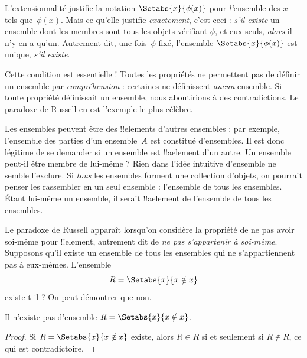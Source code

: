 \documentclass[../../../include/open-logic-section]{subfiles}
\begin{document}

L'extensionnalité justifie la notation $\Setabs{x}{\phi(x)}$ pour
\emph{l'}ensemble des $x$ tels que~$\phi(x)$. Mais ce qu'elle
justifie \emph{exactement}, c'est ceci : \emph{s'il existe}
un ensemble dont les membres sont tous les objets vérifiant
$\phi$, et eux seuls, \emph{alors} il n'y en a qu'un.
Autrement dit, une fois~$\phi$ fixé, l'ensemble
$\Setabs{x}{\phi(x)}$ est unique, \emph{s'il existe}.

Cette condition est essentielle !{} Toutes les propriétés ne
permettent pas de définir un ensemble par \emph{compréhension} :
certaines ne définissent \emph{aucun} ensemble.
Si toute propriété définissait un ensemble, nous aboutirions
à des contradictions. Le paradoxe de Russell en est l'exemple
le plus célèbre.

Les ensembles peuvent être des !!{element}s d'autres ensembles :
par exemple, l'ensemble des parties d'un ensemble~$A$ est
constitué d'ensembles. Il est donc légitime de se demander
si un ensemble est !!a{element} d'un autre.
Un ensemble peut-il être membre de lui-même ?
Rien dans l'idée intuitive d'ensemble ne semble l'exclure.
Si \emph{tous} les ensembles forment une collection d'objets,
on pourrait penser les rassembler en un seul ensemble :
l'ensemble de tous les ensembles. Étant lui-même un ensemble,
il serait !!a{element} de l'ensemble de tous les ensembles.

Le paradoxe de Russell apparaît lorsqu'on considère la propriété
de ne pas avoir soi-même pour !!{element}, autrement dit
de \emph{ne pas s'appartenir à soi-même}.
Supposons qu'il existe un ensemble de tous les ensembles
qui ne s'appartiennent pas à eux-mêmes. L'ensemble
\[
R = \Setabs{x}{x \notin x}
\]
existe-t-il ? On peut démontrer que non.

\begin{thm}
	Il n'existe pas d'ensemble $R = \Setabs{x}{x \notin x}$.
\end{thm}

\begin{proof}
Si $R = \Setabs{x}{x \notin x}$ existe, alors
$R \in R$ si et seulement si $R \notin R$,
ce qui est contradictoire.
\end{proof}
\end{document}

